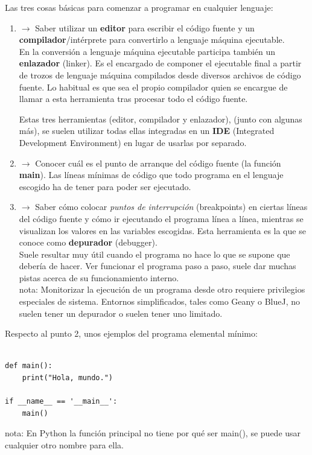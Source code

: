 \documentclass[spanish,12pt,a4paper,final,oneside]{book}
\begin{document}
Las tres cosas básicas para comenzar a programar en cualquier lenguaje:
\begin{enumerate}

\item $\rightarrow$ Saber utilizar un \textbf{editor} para escribir el código fuente y un \textbf{compilador}/intérprete para convertirlo a lenguaje máquina ejecutable.
\\{\footnotesize En la conversión a lenguaje máquina ejecutable participa también un \textbf{enlazador} (linker). Es el encargado de componer el ejecutable final a partir de trozos de lenguaje máquina compilados desde diversos archivos de código fuente. Lo habitual es que sea el propio compilador quien se encargue de llamar a esta herramienta tras procesar todo el código fuente.}

Estas tres herramientas (editor, compilador y enlazador), (junto con algunas más), se suelen utilizar todas ellas integradas en un \textbf{IDE} (Integrated Development Environment) en lugar de usarlas por separado.

\item $\rightarrow$ Conocer cuál es el punto de arranque del código fuente (la función \textbf{main}). Las líneas mínimas de código que todo programa en el lenguaje escogido ha de tener para poder ser ejecutado.

\item $\rightarrow$ Saber cómo colocar \textit{puntos de interrupción} (breakpoints) en ciertas líneas del código fuente y cómo ir ejecutando el programa línea a línea, mientras se visualizan los valores en las variables escogidas. Esta herramienta es la que se conoce como \textbf{depurador} (debugger).
\\Suele resultar muy útil cuando el programa no hace lo que se supone que debería de hacer. Ver funcionar el programa paso a paso, suele dar muchas pistas acerca de su funcionamiento interno.
\\nota: Monitorizar la ejecución de un programa desde otro requiere privilegios especiales de sistema. Entornos simplificados, tales como Geany o BlueJ, no suelen tener un depurador o suelen tener uno limitado.

\end{enumerate}

\vspace{0.5cm}
Respecto al punto 2, unos ejemplos del programa elemental mínimo:
\vspace{0.3cm}

\begin{lstlisting}[frame=single, caption=lenguaje Python]

def main():
    print("Hola, mundo.")

if __name__ == '__main__':
    main()

\end{lstlisting}
\begin{scriptsize}
nota: En Python la función principal no tiene por qué ser main(), se puede usar cualquier otro nombre para ella.
\end{scriptsize}
\end{document}
